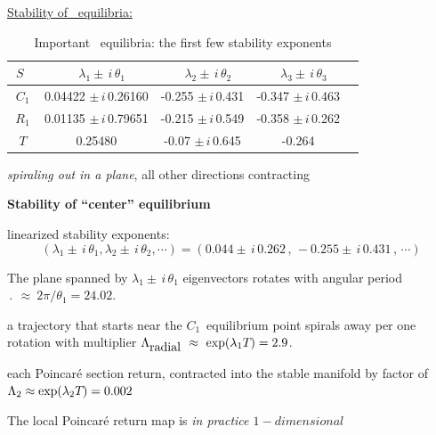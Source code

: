 \underline{Stability of \KS\ equilibria:}{ 
\begin{table}
\caption[]{
Important \KS\ equilibria:
the first few stability exponents
}
\begin{center} \footnotesize
\begin{tabular}{@{}ccccc}
\hline %
$~S~~~$ & $~~~~\lambda_1 \pm \,i\,\theta_1$ 
                                & $~~~~\lambda_2 \pm \,i\,\theta_2$ 
                                        & $~~~~\lambda_3 \pm \,i\,\theta_3$ 
\\ 
\hline %
${C_1}$    &{0.04422 $\pm \,i\,$0.26160}   &-0.255 $\pm \,i\,$0.431 
&-0.347 $\pm \,i\,$0.463         \\
\hline %
${R_1}$   &{0.01135 $\pm \,i\,$0.79651} & -0.215 $\pm \,i\,$0.549 
&-0.358 $\pm \,i\,$0.262        \\
\hline %
${T}$     & 0.25480  & -0.07 $\pm \,i\,$0.645 &-0.264  
\\
\hline %
\end{tabular}
\end{center} 
\label{t:stationary}
\end{table}

{\em 
spiraling out in a plane}, all other directions contracting


{\bf
Stability of ``center'' equilibrium
    }

linearized stability exponents: 
\[ %
(\lambda_{1}\pm\,i\,\theta_{1},\lambda_{2} \pm\,i\,\theta_{2}, \cdots)
    = (0.044 \pm \,i\,0.262\,,\,
        -0.255 \pm \,i\,0.431\,,\,\cdots)
\] %

The plane spanned by $\lambda_{1} \pm\,i\,\theta_{1}$ eigenvectors rotates with angular period
$\period{} ~\approx~2\pi/\theta_{1}=24.02$.

a trajectory 
that starts near  the $C_1$~equilibrium point spirals 
away per one rotation
with multiplier
$\Lambda_{\mbox{radial}}~\approx~\exp(\lambda_{1}{T_{}})=2.9$.

each Poincar\' e section return, 
contracted into the stable manifold by 
factor of
{
$\Lambda_{2}\approx\exp(\lambda_{2}{T_{}})=0.002$
}


The local Poincar\' e return map is 
{\em
in practice $1-dimensional$
}
    } %


